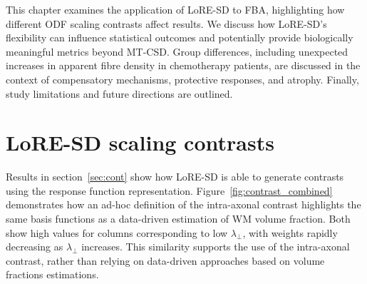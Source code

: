 This chapter examines the application of LoRE-SD to FBA, highlighting how different ODF scaling contrasts affect results. We discuss how LoRE-SD’s flexibility can influence statistical outcomes and potentially provide biologically meaningful metrics beyond MT-CSD. Group differences, including unexpected increases in apparent fibre density in chemotherapy patients, are discussed in the context of compensatory mechanisms, protective responses, and atrophy. Finally, study limitations and future directions are outlined.

\section{LoRE-SD scaling contrasts}
Results in section~\ref{sec:cont} show how LoRE-SD is able to generate contrasts using the response function representation. Figure~\ref{fig:contrast_combined} demonstrates how an ad-hoc definition of the intra-axonal contrast highlights the same basis functions as a data-driven estimation of WM volume fraction. Both show high values for columns corresponding to low $\lambda_{\perp}$, with weights rapidly decreasing as $\lambda_{\perp}$ increases. This similarity supports the use of the intra-axonal contrast, rather than relying on data-driven approaches based on volume fractions estimations.

